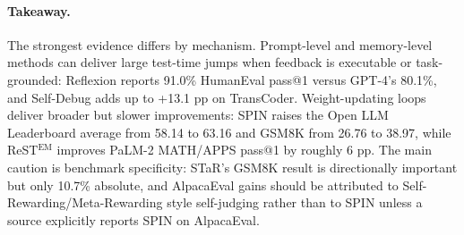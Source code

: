 \begin{table}[t]
\centering
\small
\caption{Self-Debug detailed repair evidence.  The first block gives benchmark-level improvements; the second block shows what kinds of errors were fixed among successful fixes.}
\label{tab:self-debug-repair-breakdown}
\end{table}

\paragraph{Takeaway.}
The strongest evidence differs by mechanism.  Prompt-level and memory-level methods can deliver large test-time jumps when feedback is executable or task-grounded: Reflexion reports 91.0\% HumanEval pass@1 versus GPT-4's 80.1\%, and Self-Debug adds up to +13.1 pp on TransCoder.  Weight-updating loops deliver broader but slower improvements: SPIN raises the Open LLM Leaderboard average from 58.14 to 63.16 and GSM8K from 26.76 to 38.97, while ReST$^{\mathrm{EM}}$ improves PaLM-2 MATH/APPS pass@1 by roughly 6 pp.  The main caution is benchmark specificity: STaR's GSM8K result is directionally important but only 10.7\% absolute, and AlpacaEval gains should be attributed to Self-Rewarding/Meta-Rewarding style self-judging rather than to SPIN unless a source explicitly reports SPIN on AlpacaEval.

